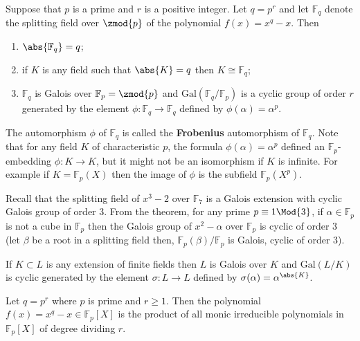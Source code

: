 \documentclass[12pt, a4paper]{article}
\newcommand{\gal}{\text{Gal}}
\begin{document}
\begin{mdthm}
    Suppose that \(p\) is a prime and \(r\) is a positive integer. Let \(q=p^r\) and let \(\mathbb{F}_q\) denote the splitting field over \(\zmod{p}\) of the polynomial \(f(x)=x^q-x\). Then 
    \begin{enumerate}
        \item \(\abs{\mathbb{F}_q}=q\);
        \item if \(K\) is any field such that \(\abs{K}=q\) then \(K \cong \mathbb{F}_q\);
        \item \(\mathbb{F}_q\) is Galois over \(\mathbb{F}_p = \zmod{p}\) and \(\gal(\mathbb{F}_q/\mathbb{F}_p)\) is a cyclic group of order \(r\) generated by the element \(\phi:\mathbb{F}_q \to \mathbb{F}_q\) defined by \(\phi(\alpha)=\alpha^p\).
    \end{enumerate}
\end{mdthm}

\begin{mdremark}
    The automorphism \(\phi\) of \(\mathbb{F}_q\) is called the \textbf{Frobenius} automorphism of \(\mathbb{F}_q\). Note that for any field \(K\) of characteristic \(p\), the formula \(\phi(\alpha)=\alpha^p\) defined an \(\mathbb{F}_p\)-embedding \(\phi:K \to K\), but it might not be an isomorphism if \(K\) is infinite. For example if \(K = \mathbb{F}_p(X)\) then the image of \(\phi\) is the subfield \(\mathbb{F}_p(X^p)\).
\end{mdremark}

\begin{mdexample}
    Recall that the splitting field of \(x^3-2\) over \(\mathbb{F}_7\) is a Galois extension with cyclic Galois group of order \(3\). From the theorem, for any prime \(p \equiv 1 \Mod{3}\), if \(\alpha \in \mathbb{F}_p\) is not a cube in \(\mathbb{F}_p\) then the Galois group of \(x^2-\alpha\) over \(\mathbb{F}_p\) is cyclic of order \(3\) (let \(\beta\) be a root in a splitting field then, \(\mathbb{F}_p(\beta)/\mathbb{F}_p\) is Galois, cyclic of order \(3\)).
\end{mdexample}

\begin{corollary}
    If \(K \subset L\) is any extension of finite fields then \(L\) is Galois over \(K\) and \(\gal(L/K)\) is cyclic generated by the element \(\sigma : L \to L\) defined by \(\sigma(\alpha)=\alpha^{\abs{K}}\).
\end{corollary}

\begin{mdcor}
    Let \(q=p^r\) where \(p\) is prime and \(r\geq 1\). Then the polynomial \(f(x)=x^q-x \in \mathbb{F}_p[X]\) is the product of all monic irreducible polynomials in \(\mathbb{F}_p[X]\) of degree dividing \(r\). 
\end{mdcor}
\end{document}
